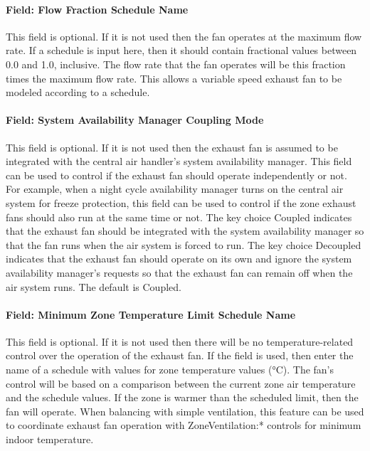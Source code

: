 \paragraph{Field: Flow Fraction Schedule Name}\label{field-flow-fraction-schedule-name}

This field is optional. If it is not used then the fan operates at the maximum flow rate. If a schedule is input here, then it should contain fractional values between 0.0 and 1.0, inclusive. The flow rate that the fan operates will be this fraction times the maximum flow rate. This allows a variable speed exhaust fan to be modeled according to a schedule.

\paragraph{Field: System Availability Manager Coupling Mode}\label{field-system-availability-manager-coupling-mode}

This field is optional. If it is not used then the exhaust fan is assumed to be integrated with the central air handler's system availability manager. This field can be used to control if the exhaust fan should operate independently or not. For example, when a night cycle availability manager turns on the central air system for freeze protection, this field can be used to control if the zone exhaust fans should also run at the same time or not. The key choice Coupled indicates that the exhaust fan should be integrated with the system availability manager so that the fan runs when the air system is forced to run. The key choice Decoupled indicates that the exhaust fan should operate on its own and ignore the system availability manager's requests so that the exhaust fan can remain off when the air system runs. The default is Coupled.

\paragraph{Field: Minimum Zone Temperature Limit Schedule Name}\label{field-minimum-zone-temperature-limit-schedule-name}

This field is optional. If it is not used then there will be no temperature-related control over the operation of the exhaust fan. If the field is used, then enter the name of a schedule with values for zone temperature values (°C). The fan's control will be based on a comparison between the current zone air temperature and the schedule values. If the zone is warmer than the scheduled limit, then the fan will operate. When balancing with simple ventilation, this feature can be used to coordinate exhaust fan operation with ZoneVentilation:* controls for minimum indoor temperature.

